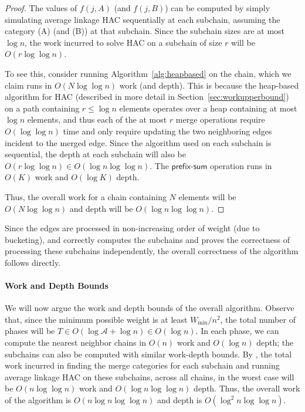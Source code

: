 \documentclass[11pt]{article}
\begin{document}
\begin{proof}
    The values of $f(j,A)$ (and $f(j,B)$) can be computed by simply simulating average linkage HAC sequentially at each subchain, assuming the category (A) (and (B)) at that subchain. 
    Since the subchain sizes are at most $\log n$, the work incurred to solve HAC on a subchain of size $r$ will be $O(r\log\log n)$.
    
    To see this, consider running Algorithm~\ref{alg:heapbased} on the chain, which we claim runs in $O(N\log\log n)$ work (and depth).
    This is because the heap-based algorithm for HAC (described in more detail in Section~\ref{sec:workupperbound}) on a path containing $r \leq \log n$ elements operates over a heap containing at most $\log n$ elements, and thus each of the at most $r$ merge operations require $O(\log \log n)$ time and only require updating the two neighboring edges incident to the merged edge.
    Since the algorithm used on each subchain is sequential, the depth at each subchain will also be $O(r\log\log n) \in O(\log n\log\log n)$. 
    The $\mathsf{prefix\text{-}sum}$ operation runs in $O(K)$ work and $O(\log K)$ depth. 
    
    Thus, the overall work for a chain containing $N$ elements will be $O(N\log\log n)$ and depth will be $O(\log n\log\log n)$.
\end{proof}

Since the edges are processed in non-increasing order of weight (due to bucketing), and  correctly computes the subchains and proves the correctness of processing these subchains independently, the overall correctness of the algorithm follows directly.

\paragraph{Work and Depth Bounds}
We will now argue the work and depth bounds of the overall algorithm.
Observe that, since the minimum possible weight is at least $W_{\min}/n^2$, the total number of phases will be $T \in O(\log \mathcal{A} + \log n) \in O(\log n)$. 
In each phase, we can compute the nearest neighbor chains in $O(n)$ work and $O(\log n)$ depth; the subchains can also be computed with similar work-depth bounds. By , the total work incurred in finding the merge categories for each subchain and running average linkage HAC on these subchains, across all chains, in the worst case will be $O(n\log\log n)$ work and $O(\log n\log\log n)$ depth. Thus, the overall work of the algorithm is $O(n\log n\log\log n)$ and depth is $O(\log^2n\log\log n)$. 
\end{document}

